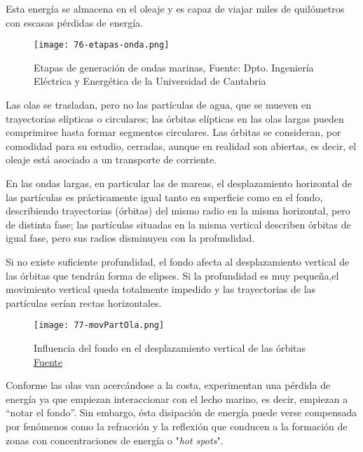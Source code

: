 Esta energía se almacena en el oleaje y es capaz de viajar miles de
quilómetros con escasas pérdidas de energía.

\begin{figure}
\centering
\texttt{[image: 76-etapas-onda.png]}
\caption[Etapas de generación de ondas marinas]{Etapas de generación de ondas marinas, Fuente: Dpto. Ingeniería
Eléctrica y Energética de la Universidad de Cantabria}
\end{figure}



Las olas se trasladan, pero no las partículas de agua, que se mueven en
trayectorias elípticas o circulares; las órbitas elípticas en las olas
largas pueden comprimirse hasta formar segmentos circulares. Las órbitas
se consideran, por comodidad para su estudio, cerradas, aunque en
realidad son abiertas, es decir, el oleaje está asociado a un transporte
de corriente.

En las ondas largas, en particular las de mareas, el desplazamiento
horizontal de las partículas es prácticamente igual tanto en superficie
como en el fondo, describiendo trayectorias (órbitas) del mismo radio en
la misma horizontal, pero de distinta fase; las partículas situadas en
la misma vertical describen órbitas de igual fase, pero sus radios
disminuyen con la profundidad.

Si no existe suficiente profundidad, el fondo afecta al desplazamiento
vertical de las órbitas que tendrán forma de elipses. Si la profundidad
es muy pequeña,el movimiento vertical queda totalmente impedido y las
trayectorias de las partículas serían rectas horizontales.

\begin{figure}
\centering
\texttt{[image: 77-movPartOla.png]}
\caption[Influencia del fondo en el desplazamiento vertical de las órbitas]{Influencia del fondo en el desplazamiento vertical de las órbitas \href{http://files.pfernandezdiez.es/EnergiasAlternativas/mar/PDFs/01Olas.pdf}{Fuente}}
\end{figure}



Conforme las olas van acercándose a la costa, experimentan una pérdida
de energía ya que empiezan interaccionar con el lecho marino, es decir,
empiezan a ``notar el fondo''. Sin embargo, ésta disipación de energía
puede verse compensada por fenómenos como la refracción y la reflexión
que conducen a la formación de zonas con concentraciones de energía o
"\emph{hot spots}".

